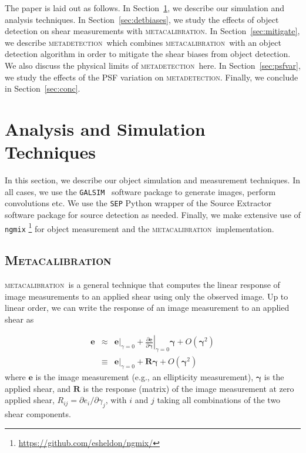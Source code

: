 \documentclass[fleqn,useAMS,usenatbib]{mnras}
\newcommand{\galsim}{\texttt{GALSIM}}
\newcommand{\ngmix}{\texttt{ngmix}}
\newcommand{\mcal}{\textsc{metacalibration}}
\newcommand{\mdet}{\textsc{metadetection}}
\begin{document}
The paper is laid out as follows. In Section~\ref{sec:sims}, we describe our
simulation and analysis techniques. In Section~\ref{sec:detbiases}, we study
the effects of object detection on shear measurements with \mcal.
In Section~\ref{sec:mitigate}, we describe \mdet\ which combines \mcal\ with
an object detection algorithm in order to mitigate the shear biases from object
detection. We also discuss the physical limits of \mdet\ here.
In Section~\ref{sec:psfvar}, we study the effects of the PSF variation on \mdet.
Finally, we conclude in Section~\ref{sec:conc}.

\section{Analysis and Simulation Techniques}
\label{sec:sims}

In this section, we describe our object simulation and measurement techniques.
In all cases, we use the \galsim\ \citep{GALSIM2015} software package to
generate images, perform convolutions etc. We use the \texttt{SEP} \citep{sep}
Python wrapper of the Source Extractor software package \citep{Bertin96} for
source detection as needed. Finally, we make extensive use of \ngmix
\footnote{\url{https://github.com/esheldon/ngmix/}} for object measurement and
the \mcal\ implementation.

\subsection{\textsc{Metacalibration}}

\mcal\ is a general technique that computes the linear response of image
measurements to an applied shear using only the observed image. Up to linear
order, we can write the response of an image measurement to an applied shear as

\begin{eqnarray}
\boldsymbol{e} & \approx & \left.\boldsymbol{e}\right|_{\gamma=0} +
                           \left.\frac{\partial \boldsymbol{e}}{\partial\boldsymbol\gamma}\right|_{\gamma=0} \boldsymbol\gamma +
                           O(\boldsymbol\gamma^2)\nonumber\\
               & \equiv  & \left.\boldsymbol{e}\right|_{\gamma=0} +
                           \boldsymbol{R} \boldsymbol\gamma +
                           O(\boldsymbol\gamma^2)
\end{eqnarray}
where $\boldsymbol{e}$ is the image measurement (e.g., an ellipticity
measurement), $\boldsymbol\gamma$ is the applied shear, and $\boldsymbol{R}$ is
the response (matrix) of the image measurement at zero applied shear,
$R_{ij}=\partial e_i /\partial \gamma_j$, with $i$ and $j$ taking all
combinations of the two shear components.
\end{document}
